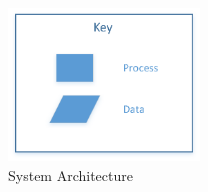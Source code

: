 \begin{figure}[H]
	\centering
	\includegraphics[width=2in]{SysArchKey}
    \caption{System Architecture}
\end{figure}

